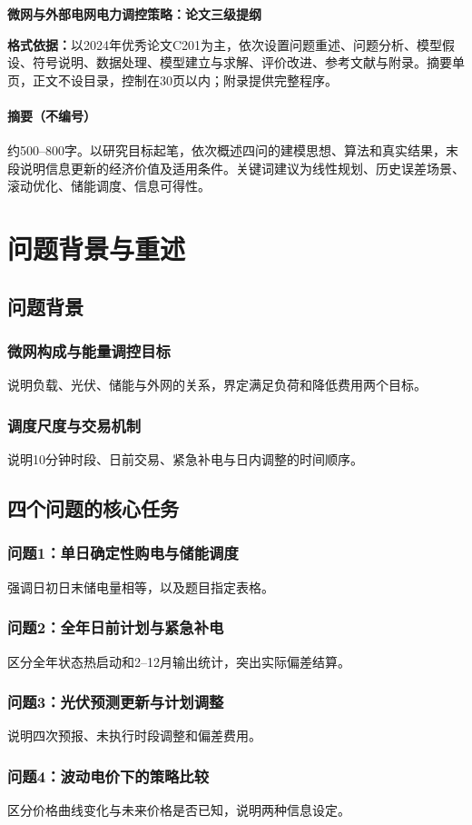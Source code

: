 \documentclass[UTF8,a4paper,zihao=-4]{ctexart}
\begin{document}
\begin{center}\Large\bfseries 微网与外部电网电力调控策略：论文三级提纲\end{center}
\noindent\textbf{格式依据：}以2024年优秀论文C201为主，依次设置问题重述、问题分析、模型假设、符号说明、数据处理、模型建立与求解、评价改进、参考文献与附录。摘要单页，正文不设目录，控制在30页以内；附录提供完整程序。
\paragraph{摘要（不编号）}约500--800字。以研究目标起笔，依次概述四问的建模思想、算法和真实结果，末段说明信息更新的经济价值及适用条件。关键词建议为线性规划、历史误差场景、滚动优化、储能调度、信息可得性。
\section{问题背景与重述}
\subsection{问题背景}
\subsubsection{微网构成与能量调控目标}说明负载、光伏、储能与外网的关系，界定满足负荷和降低费用两个目标。
\subsubsection{调度尺度与交易机制}说明10分钟时段、日前交易、紧急补电与日内调整的时间顺序。
\subsection{四个问题的核心任务}
\subsubsection{问题1：单日确定性购电与储能调度}强调日初日末储电量相等，以及题目指定表格。
\subsubsection{问题2：全年日前计划与紧急补电}区分全年状态热启动和2--12月输出统计，突出实际偏差结算。
\subsubsection{问题3：光伏预测更新与计划调整}说明四次预报、未执行时段调整和偏差费用。
\subsubsection{问题4：波动电价下的策略比较}区分价格曲线变化与未来价格是否已知，说明两种信息设定。
\end{document}
